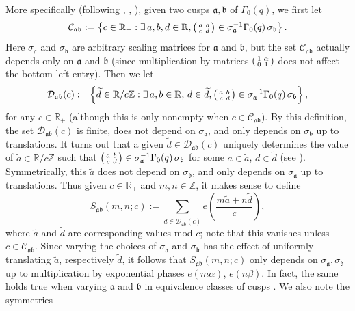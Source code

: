 \documentclass[reqno,11pt]{amsart}
\theoremstyle{remark}
\numberwithin{equation}{section}
\newcommand{\Z}{\mathbb{Z}}
\newcommand{\R}{\mathbb{R}}
\newcommand{\mC}{\mathcal{C}}
\newcommand{\mD}{\mathcal{D}}
\newcommand{\ma}{\mathfrak{a}}
\newcommand{\mb}{\mathfrak{b}}
\renewcommand{\tilde}{\widetilde}
\newenvironment{psmall}
  {\left(\begin{smallmatrix}}
  {\end{smallmatrix}\right)}
\begin{document}
More specifically (following \cite[(1.3)]{deshouillers1982kloosterman}, \cite[\S 4.1.1]{drappeau2017sums}, \cite{iwaniec1997topics}), given two cusps $\ma, \mb$ of $\Gamma_0(q)$, we first let
\[
    \mC_{\ma\mb} := \left\{c \in \R_+ : \exists\, a, b, d \in \R, \begin{psmall} a & b \\ c & d \end{psmall} \in \sigma_{\ma}^{-1} \Gamma_0(q)\, \sigma_{\mb} \right\}.
\]
Here $\sigma_{\ma}$ and $\sigma_{\mb}$ are arbitrary scaling matrices for $\ma$ and $\mb$, but the set $\mC_{\ma\mb}$ actually depends only on $\ma$ and $\mb$ (since multiplication by matrices $\begin{psmall} 1 & \alpha \\ 0 & 1 \end{psmall}$ does not affect the bottom-left entry). Then we let
\[
    \mD_{\ma\mb}(c) := \left\{ \tilde{d} \in \R/c\Z : \exists\, a, b \in \R,\, d \in \tilde{d}, \begin{psmall} a & b \\ c & d \end{psmall} \in \sigma_{\ma}^{-1} \Gamma_0(q)\, \sigma_{\mb} \right\},
\]
for any $c \in \R_+$ (although this is only nonempty when $c \in \mC_{\ma \mb}$). By this definition, the set $\mD_{\ma\mb}(c)$ is finite, does not depend on $\sigma_{\ma}$, and only depends on $\sigma_{\mb}$ up to translations. It turns out that a given $\tilde{d} \in \mD_{\ma \mb}(c)$ uniquely determines the value of $\tilde{a} \in \R/c\Z$ such that $\begin{psmall} a & b \\ c & d \end{psmall} \in \sigma_{\ma}^{-1} \Gamma_0(q)\, \sigma_{\mb}$ for some $a \in \tilde{a}$, $d \in \tilde{d}$ (see \cite[p.\,239]{deshouillers1982kloosterman}). Symmetrically, this $\tilde{a}$ does not depend on $\sigma_{\mb}$, and only depends on $\sigma_{\ma}$ up to translations. Thus given $c \in \R_+$ and $m, n \in \Z$, it makes sense to define
\begin{equation} \label{eq:generalized-kloosterman}
    S_{\ma \mb}(m, n; c) := 
    \sum_{\tilde{d} \in \mD_{\ma \mb}(c)}
    e\left(\frac{m \tilde{a} + n \tilde{d}}{c}\right),
\end{equation}
where $\tilde{a}$ and $\tilde{d}$ are corresponding values mod $c$; note that this vanishes unless $c \in \mC_{\ma\mb}$. Since varying the choices of $\sigma_{\ma}$ and $\sigma_{\mb}$ has the effect of uniformly translating $\tilde{a}$, respectively $\tilde{d}$, it follows that $S_{\ma \mb}(m, n; c)$ only depends on $\sigma_{\ma}, \sigma_{\mb}$ up to multiplication by exponential phases $e(m\alpha)$, $e(n\beta)$. In fact, the same holds true when varying $\ma$ and $\mb$ in equivalence classes of cusps \cite[p.\,239]{deshouillers1982kloosterman}. We also note the symmetries
\end{document}
